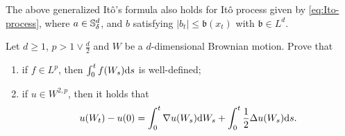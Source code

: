  \begin{remark}
     The above generalized It\^o's formula also holds for Itô process given by \eqref{eq:Ito-process}, where $a\in {\mathbb S}^d_\delta$, and $b$ satisfying $|b_t|\leq \mathfrak{b}(x_t)$ with $\mathfrak{b}\in L^d$. 
 \end{remark}

 \begin{exercise}
     Let \(d\geq 1\), \(p>1\vee \frac{d}{2}\) and \(W\) be a \(d\)-dimensional Brownian motion. Prove that 
     \begin{enumerate}
         \item if \(f\in L^p\), then \(\int_0^t f(W_s) \text{\rm{d}} s\) is well-defined; 
         \item if \(u\in W^{2,p}\), then it holds that 
         \[
             u(W_t)-u(0)=\int_0^t \nabla u(W_s) \text{\rm{d}} W_s+\int_0^t \frac{1}{2}\Delta u(W_s) \text{\rm{d}} s. 
         \]
     \end{enumerate}
 \end{exercise}

 